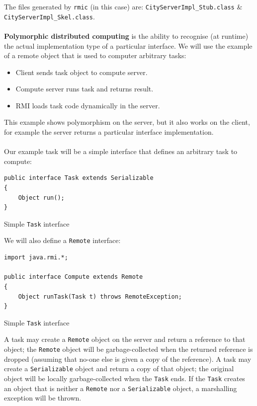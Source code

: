 \documentclass[a4paper,11pt]{article}
\newenvironment{code}{\captionsetup{type=listing}}{}
\begin{document}
The files generated by \texttt{rmic} (in this case) are: \verb|CityServerImpl_Stub.class| \& \verb|CityServerImpl_Skel.class|.
\\\\
\textbf{Polymorphic distributed computing} is the ability to recognise (at runtime) the actual implementation type of a particular interface.
We will use the example of a remote object that is used to computer arbitrary tasks:
\begin{itemize}
    \item   Client sends task object to compute server.
    \item   Compute server runs task and returns result.
    \item   RMI loads task code dynamically in the server.
\end{itemize}
This example shows polymorphism on the server, but it also works on the client, for example the server returns a particular interface implementation.
\\\\
Our example task will be a simple interface that defines an arbitrary task to compute:
\begin{code}
\begin{verbatim}
public interface Task extends Serializable
{
    Object run();
}
\end{verbatim}
\caption{Simple \texttt{Task} interface}
\end{code}

We will also define a \texttt{Remote} interface:
\begin{code}
\begin{verbatim}
import java.rmi.*;

public interface Compute extends Remote
{
    Object runTask(Task t) throws RemoteException;
}
\end{verbatim}
\caption{Simple \texttt{Task} interface}
\end{code}

A task may create a \texttt{Remote} object on the server and return a reference to that object; the \texttt{Remote} object will be garbage-collected when the returned reference is dropped (assuming that no-one else is given a copy of the reference).
A task may create a \texttt{Serializable} object and return a copy of that object; the original object will be locally garbage-collected when the \texttt{Task} ends.
If the \texttt{Task} creates an object that is neither a \texttt{Remote} nor a \texttt{Serializable} object, a marshalling exception will be thrown.
\end{document}
